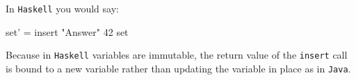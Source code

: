 \documentclass[11pt]{amsart}
\newenvironment{Shaded}{}{}
\newcommand{\DecValTok}[1]{\textcolor[rgb]{0.25,0.63,0.44}{{#1}}}
\newcommand{\StringTok}[1]{\textcolor[rgb]{0.25,0.44,0.63}{{#1}}}
\newcommand{\FunctionTok}[1]{\textcolor[rgb]{0.02,0.16,0.49}{{#1}}}
\newcommand{\NormalTok}[1]{{#1}}
\begin{document}
In \texttt{Haskell} you would say:

\begin{Shaded}
\begin{Highlighting}[]
    \NormalTok{set' }\FunctionTok{=} \NormalTok{insert }\StringTok{"Answer"} \DecValTok{42} \NormalTok{set}
\end{Highlighting}
\end{Shaded}

Because in \texttt{Haskell} variables are immutable, the return value of
the \texttt{insert} call is bound to a new variable rather than updating
the variable in place as in \texttt{Java}.
\end{document}
